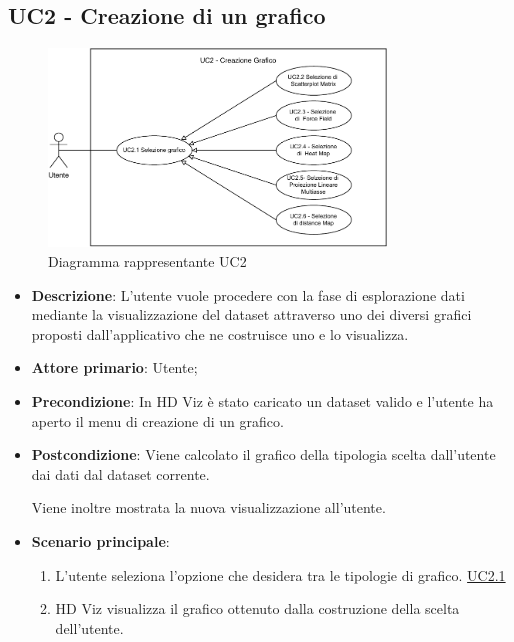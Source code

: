 \subsection{UC2 - Creazione di un grafico}
\label{sub:uc2}

\begin{figure}[h]
    \centering
    \includegraphics[width=0.8\textwidth]{componenti/casi-duso/diagrammi/UC2.pdf}
    \caption{Diagramma rappresentante UC2}
    \label{fig:UC2}
\end{figure}


\begin{itemize}
    \item \textbf{Descrizione}: L’utente vuole procedere con la fase di esplorazione
                                dati mediante la visualizzazione del dataset
                                attraverso uno dei diversi grafici proposti dall’applicativo
                                che ne costruisce uno e lo visualizza.
	
    \item \textbf{Attore primario}: Utente;
    
    \item \textbf{Precondizione}:   In HD Viz è stato caricato un dataset valido e
									l'utente ha aperto il menu di creazione di un grafico.

    \item \textbf{Postcondizione}:  Viene calcolato il grafico della tipologia scelta dall'utente dai dati 
									dal dataset corrente. 
									
									Viene inoltre mostrata la nuova visualizzazione all'utente.

	\item \textbf{Scenario principale}:
		\begin{enumerate}
			\item L'utente seleziona l'opzione che desidera tra le tipologie di grafico. \hyperref[ssub:uc2.1]{UC2.1}
			\item HD Viz visualizza il grafico ottenuto dalla costruzione della scelta dell'utente.
		\end{enumerate}
\end{itemize}

